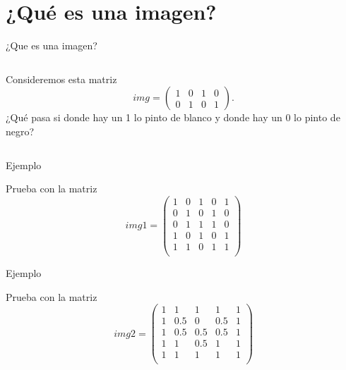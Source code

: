 \section{¿Qué es una imagen?}


\begin{frame}{¿Que es una imagen?}

    \vspace{1cm}
    \begin{columns}
    \column{6cm}
        Consideremos esta matriz
        \[
            img = \begin{pmatrix}
                1& 0& 1& 0\\
                0& 1& 0& 1
            \end{pmatrix}.
        \]
        ¿Qué pasa si donde hay un 1 lo pinto de blanco y donde hay un 0 lo pinto de negro?\pause
    \column{6cm}
    \end{columns}

\end{frame}


\begin{frame}{Ejemplo}
    
    \vspace{0.5cm}
    Prueba con la matriz
    \[
        img1 = \begin{pmatrix}
            1& 0& 1& 0& 1\\
            0& 1& 0& 1& 0\\
            0& 1& 1& 1& 0\\
            1& 0& 1& 0& 1\\
            1& 1& 0& 1& 1\\
        \end{pmatrix}
    \]
    \vfill

\end{frame}

\begin{frame}{Ejemplo}
    
    \vspace{0.5cm}
    Prueba con la matriz
    \[
        img2 = \begin{pmatrix}
            1& 1  & 1  & 1  & 1\\
            1& 0.5& 0  & 0.5& 1\\
            1& 0.5& 0.5& 0.5& 1\\
            1& 1  & 0.5& 1  & 1\\
            1& 1  & 1  & 1  & 1\\
        \end{pmatrix}
    \]
    \vfill

\end{frame}

